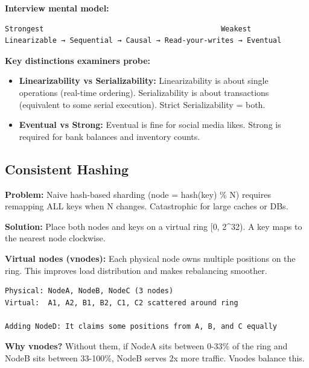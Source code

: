 \documentclass[11pt]{article}
\providecommand{\tightlist}{\setlength{\itemsep}{1pt}\setlength{\parskip}{0pt}}
\begin{document}
\textbf{Interview mental model:}

\setcodelang{}

\begin{verbatim}
Strongest                                         Weakest
Linearizable → Sequential → Causal → Read-your-writes → Eventual
\end{verbatim}

\textbf{Key distinctions examiners probe:}

\begin{itemize}
\tightlist
\item
  \textbf{Linearizability vs Serializability:} Linearizability is about single operations (real-time ordering). Serializability is about transactions (equivalent to some serial execution). Strict Serializability = both.
\item
  \textbf{Eventual vs Strong:} Eventual is fine for social media likes. Strong is required for bank balances and inventory counts.
\end{itemize}

\subsection{Consistent Hashing}\label{consistent-hashing}

\textbf{Problem:} Naive hash-based sharding (node = hash(key) \% N) requires remapping ALL keys when N changes. Catastrophic for large caches or DBs.

\textbf{Solution:} Place both nodes and keys on a virtual ring {[}0, 2\^{}32). A key maps to the nearest node clockwise.


\textbf{Virtual nodes (vnodes):}
Each physical node owns multiple positions on the ring. This improves load distribution and makes rebalancing smoother.

\setcodelang{}

\begin{verbatim}
Physical: NodeA, NodeB, NodeC (3 nodes)
Virtual:  A1, A2, B1, B2, C1, C2 scattered around ring

Adding NodeD: It claims some positions from A, B, and C equally
\end{verbatim}

\textbf{Why vnodes?} Without them, if NodeA sits between 0-33\% of the ring and NodeB sits between 33-100\%, NodeB serves 2x more traffic. Vnodes balance this.
\end{document}
